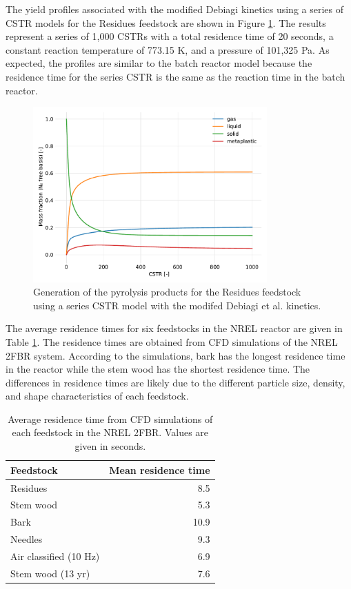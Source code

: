 The yield profiles associated with the modified Debiagi kinetics using a series of CSTR models for the Residues feedstock are shown in Figure \ref{fig:cstr-products}. The results represent a series of 1,000 CSTRs with a total residence time of 20 seconds, a constant reaction temperature of 773.15 K, and a pressure of 101,325 Pa. As expected, the profiles are similar to the batch reactor model because the residence time for the series CSTR is the same as the reaction time in the batch reactor.

\begin{figure}[H]
    \centering
    \includegraphics[width=0.8\textwidth]{figures/cstr-products.pdf}
    \caption{Generation of the pyrolysis products for the Residues feedstock using a series CSTR model with the modifed Debiagi et al. kinetics.}
    \label{fig:cstr-products}
\end{figure}

The average residence times for six feedstocks in the NREL reactor are given in Table \ref{tab:residence}. The residence times are obtained from CFD simulations of the NREL 2FBR system. According to the simulations, bark has the longest residence time in the reactor while the stem wood has the shortest residence time. The differences in residence times are likely due to the different particle size, density, and shape characteristics of each feedstock.

\begin{table}[H]
    \caption{Average residence time from CFD simulations of each feedstock in the NREL 2FBR. Values are given in seconds.}
    \label{tab:residence}
    \centering
    \begin{tabular}{lr}
        \toprule
        Feedstock & Mean residence time \\
        \midrule
        Residues               & 8.5 \\
        Stem wood              & 5.3 \\
        Bark                   & 10.9 \\
        Needles                & 9.3 \\
        Air classified (10 Hz) & 6.9 \\
        Stem wood (13 yr)      & 7.6 \\
        \bottomrule
    \end{tabular}
\end{table}

